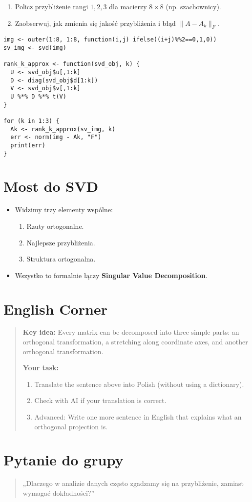 \documentclass[12pt]{article}
\begin{document}
\begin{enumerate}[resume,label=\textbf{Z\arabic*}.]
  \item Policz przybliżenie rangi $1,2,3$ dla macierzy $8\times 8$ (np. szachownicy).
  \item Zaobserwuj, jak zmienia się jakość przybliżenia i błąd $\|A-A_k\|_F$.
\end{enumerate}

\begin{lstlisting}
img <- outer(1:8, 1:8, function(i,j) ifelse((i+j)%%2==0,1,0))
sv_img <- svd(img)

rank_k_approx <- function(svd_obj, k) {
  U <- svd_obj$u[,1:k]
  D <- diag(svd_obj$d[1:k])
  V <- svd_obj$v[,1:k]
  U %*% D %*% t(V)
}

for (k in 1:3) {
  Ak <- rank_k_approx(sv_img, k)
  err <- norm(img - Ak, "F")
  print(err)
}
\end{lstlisting}

\section{Most do SVD}
\begin{itemize}
  \item Widzimy trzy elementy wspólne:
  \begin{enumerate}
    \item Rzuty ortogonalne.
    \item Najlepsze przybliżenia.
    \item Struktura ortogonalna.
  \end{enumerate}
  \item Wszystko to formalnie łączy \textbf{Singular Value Decomposition}.
\end{itemize}

\section*{English Corner}
\begin{quote}
\textbf{Key idea:} Every matrix can be decomposed into three simple parts: 
an orthogonal transformation, a stretching along coordinate axes, 
and another orthogonal transformation.

\medskip
\textbf{Your task:}
\begin{enumerate}
  \item Translate the sentence above into Polish (without using a dictionary).
  \item Check with AI if your translation is correct.
  \item Advanced: Write one more sentence in English that explains 
        what an orthogonal projection is.
\end{enumerate}
\end{quote}


\section*{Pytanie do grupy}
\begin{quote}
„Dlaczego w analizie danych często zgadzamy się na przybliżenie, zamiast wymagać dokładności?”
\end{quote}
\end{document}

